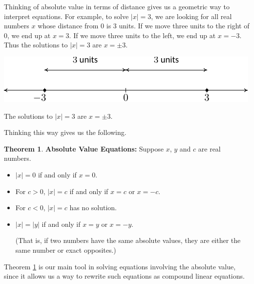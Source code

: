 \documentclass[11pt]{article}
\theoremstyle{definition}  %
\newtheorem{thm}{\bf Theorem}
\newcommand{\bbm}{\begin{boxedminipage}{6.41in}}
\newcommand{\ebm}{\end{boxedminipage}}
\begin{document}
Thinking of absolute value in terms of distance gives us a geometric way to interpret equations.  For example, to solve $|x| = 3$, we are looking for all real numbers $x$ whose distance from $0$ is $3$ units.  If we move three units to the right of $0$, we end up at $x = 3$.  If we move three units to the left, we end up at $x = -3$.  Thus the solutions to  $|x| = 3$ are $x = \pm 3$.  


\begin{center}

\includegraphics{AbsValEqIneq-3}

The solutions to  $|x| = 3$ are $x = \pm 3$.  

\end{center}



Thinking this way gives us the following.

\medskip

\colorbox{ResultColor}{\bbm

\begin{thm} \textbf{Absolute Value Equations: }\label{absvalequality}  Suppose $x$, $y$ and $c$ are real numbers.

\begin{itemize}

\item  $|x| = 0$ if and only if $x = 0$.

\item  For $c > 0$, $|x| = c$ if and only if $x = c$ or $x = -c$.

\item  For $c < 0$, $|x| = c$ has no solution.

\item  $|x| = |y|$ if and only if $x = y$ or $x = -y$. 

(That is,  if two numbers have the same absolute values, they are either the same number or exact opposites.) 

\end{itemize}

\end{thm}

\ebm}

\medskip

Theorem \ref{absvalequality} is our main tool in solving equations involving the absolute value, since it allows us a way to rewrite such equations as compound linear equations.
\end{document}
